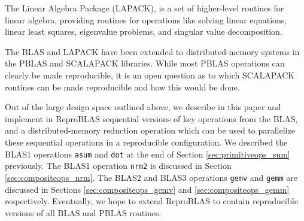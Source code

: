   The Linear Algebra Package (LAPACK), is a set of higher-level
  routines for linear algebra, providing routines for operations like solving linear equations, linear least squares, eigenvalue problems, and singular value decomposition.

  The BLAS and LAPACK have been extended to distributed-memory systems in the PBLAS and SCALAPACK libraries. While most PBLAS operations can clearly be made reproducible, it is an open question as to which SCALAPACK routines can be made reproducible and how this would be done. 

  Out of the large design space outlined above, we describe in this paper and implement in ReproBLAS sequential versions of key operations from the BLAS, and a distributed-memory reduction operation which can be used to parallelize these sequential operations in a reproducible configuration. We described the BLAS1 operations \texttt{asum} and \texttt{dot} at the end of Section \ref{sec:primitiveops_sum} previously. The BLAS1 operation \texttt{nrm2} is discussed in Section \ref{sec:compositeops_nrm}. The BLAS2 and BLAS3 operations \texttt{gemv} and \texttt{gemm} are discussed in Sections \ref{sec:compositeops_gemv} and \ref{sec:compositeops_gemm} respectively. Eventually, we hope to extend ReproBLAS to contain reproducible versions of all BLAS and PBLAS routines.

    
    
    
    
